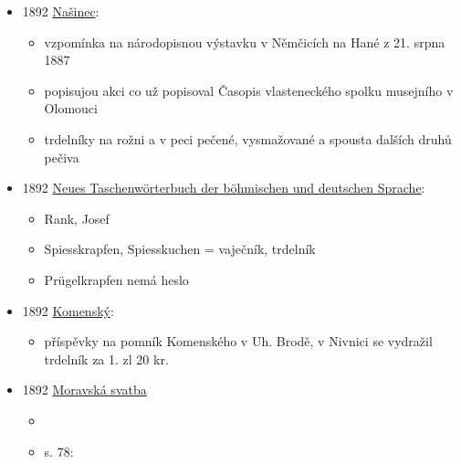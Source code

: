 \begin{itemize}
  \begin{itemize}
  \tightlist
  \item
    pozvánka na pomlázku Vesninu v Brně, budou bábovky, mazance, koláče,
    trdelníky, koblihy
  \end{itemize}
\item
  1892
  \href{https://ceskadigitalniknihovna.cz/uuid/uuid:852faf14-821a-11e0-b92b-0050569d679d}{Našinec}:

  \begin{itemize}
  \tightlist
  \item
    vzpomínka na národopisnou výstavku v Němčicích na Hané z 21. srpna
    1887
  \item
    popisujou akci co už popisoval Časopis vlasteneckého spolku
    musejního v Olomouci
  \item
    trdelníky na rožni a v peci pečené, vysmažované a spousta dalších
    druhů pečiva
  \end{itemize}
\item
  1892
  \href{https://ceskadigitalniknihovna.cz/uuid/uuid:0869a320-dc1a-11e6-9e7e-001018b5eb5c}{Neues
  Taschenwörterbuch der böhmischen und deutschen Sprache}:

  \begin{itemize}
  \tightlist
  \item
    Rank, Josef
  \item
    Spiesskrapfen, Spiesskuchen = vaječník, trdelník
  \item
    Prügelkrapfen nemá heslo
  \end{itemize}
\item
  1892
  \href{https://www.google.cz/books/edition/Komensk\%C3\%BD/twVGAQAAMAAJ?hl=cs&gbpv=1&dq=trdeln\%C3\%ADk&pg=RA2-PA181&printsec=frontcover}{Komenský}:

  \begin{itemize}
  \tightlist
  \item
    příspěvky na pomník Komenského v Uh. Brodě, v Nivnici se vydražil
    trdelník za 1. zl 20 kr.
  \end{itemize}
\item
  1892
  \href{https://ndk.cz/view/uuid:289bb2c0-9f1e-11dc-bf2d-000d606f5dc6?page=uuid\%3Aca676860-e56d-11e7-8cdd-5ef3fc9bb22f&fulltext=trdeln\%C3\%ADky}{Moravská
  svatba}

  \begin{itemize}
  \tightlist
  \item
  \item
    s. 78:


\end{itemize}
\end{itemize}
